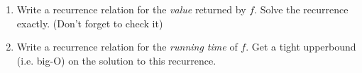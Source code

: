 \documentclass[11pt]{article}
\begin{document}
\begin{enumerate}
\begin{enumerate}
\item Write a recurrence relation for the \emph{value} returned by
$f$.  Solve the recurrence exactly.  (Don't forget to check it)
\item Write a recurrence relation for the \emph{running time} of $f$.
Get a tight upperbound (i.e. big-O) on the solution to this
recurrence. 
\end{enumerate}

\end{enumerate}
\end{document}
